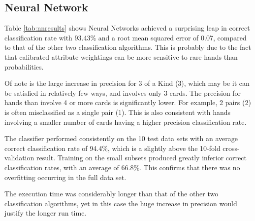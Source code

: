 \documentclass[10pt, a4paper]{article}
\begin{document}
\subsection*{Neural Network}

Table \ref{tab:nnresults} shows Neural Networks achieved a surprising leap in correct classification rate with 93.43\% and a root mean squared error of 0.07, compared to that of the other two classification algorithms. This is probably due to the fact that calibrated attribute weightings can be more sensitive to rare hands than probabilities.

Of note is the large increase in precision for 3 of a Kind (3), which may be it can be satisfied in relatively few ways, and involves only 3 cards. The precision for hands than involve 4 or more cards is significantly lower. For example, 2 pairs (2) is often misclassified as a single pair (1). This is also consistent with hands involving a smaller number of cards having a higher precision classification rate. 

The classifier performed consistently on the 10 test data sets with an average correct classification rate of 94.4\%, which is a slightly above the 10-fold cross-validation result. Training on the small subsets produced greatly inferior correct classification rates, with an average of 66.8\%. This confirms that there was no overfitting occurring in the full data set.

The execution time was considerably longer than that of the other two classification algorithms, yet in this case the huge increase in precision would justify the longer run time.
                 
\end{document}
